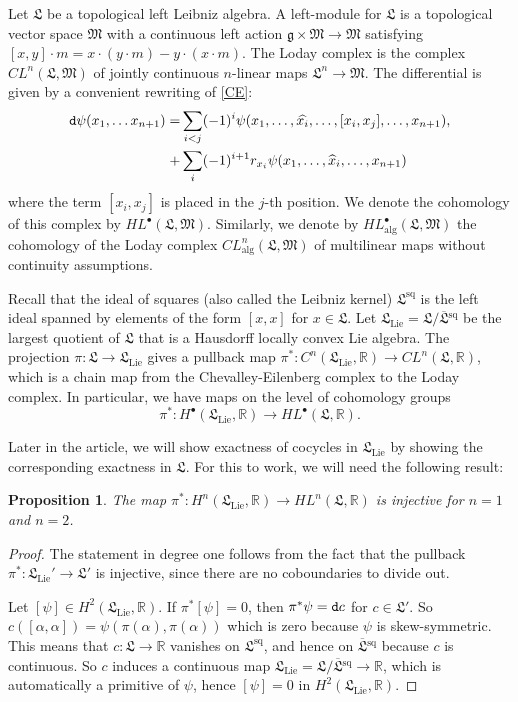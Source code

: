 \documentclass{article}
\newcommand{\sq}{\mathrm{sq}}
\newcommand{\R}{\mathbb{R}}
\newcommand{\Lie}{\mathrm{Lie}}
\newcommand{\oline}{\overline}
\newcommand{\dd}{{\tt d}}
\newcommand{\fg}{\mathfrak{g}}
\newcommand{\fL}{\mathfrak{L}}
\newtheorem{Proposition}[Theorem]{Proposition}
\theoremstyle{definition}
\begin{document}
Let $\fL$ be a topological left Leibniz algebra. A left-module for $\fL$ is a topological vector space $\mathfrak M$ with a continuous left action 
$\fg\times \mathfrak M\to \mathfrak M$ satisfying $[x,y] \cdot m=x\cdot (y \cdot m)- y\cdot (x \cdot m)$. The Loday complex is the complex $CL^n(\fL,\mathfrak M)$ of  jointly continuous $n$-linear maps $\fL^n \rightarrow \mathfrak{M}$. The differential is given by a convenient rewriting of \eqref{CE}:
\begin{align*}
\dd \psi(x_1, \ldots x_{n+1}) = &\sum_{i<j}(-1)^i\psi(x_1,\ldots,\widehat{x_i},\ldots,[x_i,x_j],\ldots,x_{n+1}),
\\ + &\sum _i (-1)^{i+1} r_{x_i}\psi(x_1,\ldots,\widehat{x}_i, \ldots, x_{n+1})
\end{align*}
where the term $[x_i,x_j]$ is placed in the $j$-th position.
We denote the cohomology of this complex by $HL^\bullet(\fL,\mathfrak M)$.
Similarly, we denote by $HL_{\mathrm{alg}}^\bullet(\fL,\mathfrak M)$ the cohomology of the Loday complex $CL_{\mathrm{alg}}^n(\fL,\mathfrak M)$
of multilinear maps without continuity assumptions.




Recall that the ideal of squares (also called the Leibniz kernel) $\fL^{\sq}$ is the left ideal spanned by elements of the form $[x,x]$ for $x\in \fL$. Let $\fL_{\Lie} = \fL / \oline{\fL}{}^{\sq}$ be the largest quotient of $\fL$ that is a Hausdorff locally convex Lie algebra.
The projection $\pi \colon \fL \rightarrow \fL_{\Lie}$ gives a pullback map 
$\pi^*\colon C^n(\fL_{\Lie},\R)\rightarrow CL^n(\fL,\R)$,
which is a chain map from the Chevalley-Eilenberg complex to the Loday complex.
In particular, we have maps on the level of cohomology groups
\[
\pi^* \colon H^{\bullet}(\fL_{\Lie},\R) \rightarrow HL^{\bullet}(\fL,\R).
\]

Later in the article, we will show exactness of cocycles in $\fL_{\Lie}$ by showing the corresponding exactness in $\fL$. For this to work, we will need the following result:

\begin{Proposition}\label{prop:inj} The map $\pi^* \colon H^{n}(\fL_{\Lie},\R) \rightarrow HL^{n}(\fL,\R)$ is injective for $n=1$ and $n=2$.
\end{Proposition}
\begin{proof}
The statement in degree one follows from the fact that the pullback $\pi^* \colon \fL_{\Lie}' \to \fL'$ is injective, since there are no coboundaries to divide out. 

Let $[\psi] \in H^2(\fL_{\Lie},\R)$. If $\pi^*[\psi] = 0$, then 
$\pi^*\psi = \dd c$ for $c \in \fL'$.
So $c([\alpha,\alpha]) = \psi(\pi(\alpha), \pi(\alpha))$ which is zero 
because $\psi$ is skew-symmetric. This means that $c \colon \fL \rightarrow \R$ vanishes on $\fL^{\sq}$, and hence on $\oline{\fL}{}^{\sq}$ because $c$ is continuous. So $c$ induces a continuous map $\fL_{\Lie} = \fL/ \oline{\fL}{}^{\sq}\rightarrow \R$, which is automatically a primitive of $\psi$, hence $[\psi] = 0$ in 
$H^2(\fL_{\Lie},\R)$.
\end{proof}
\end{document}
